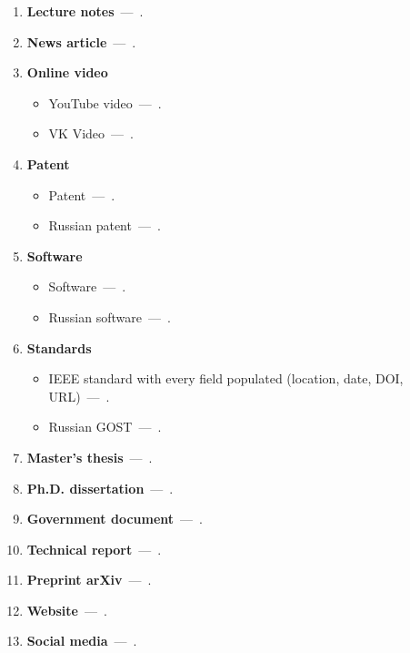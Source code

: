 \documentclass[eqsecnum,authorsinfo]{kioj6}
\begin{document}
\begin{enumerate}
        \item \textbf{Lecture notes}~---~\cite{BarneyLecture}.

        \item \textbf{News article}~---~\cite{MarkoffNews}.

        \item \textbf{Online video}
        \begin{itemize}[nosep]
            \item YouTube video~---~\cite{mtaOnlineVideo}.
            \item VK Video~---~\cite{vkVideoExample}.
        \end{itemize}

        \item \textbf{Patent}
        \begin{itemize}[nosep]
            \item Patent~---~\cite{WilkinsonPatent}.
            \item Russian patent~---~\cite{sviridov}.
        \end{itemize}

        \item \textbf{Software}
        \begin{itemize}[nosep]
            \item Software~---~\cite{ArningSoftware}.
            \item Russian software~---~\cite{schoolPassportSoftware}.
        \end{itemize}

        \item \textbf{Standards}
        \begin{itemize}[nosep]
            \item IEEE standard with every field populated (location, date, DOI, URL)~---~\cite{StdIEEE754Full}.
            \item Russian GOST~---~\cite{gostMed57647}.
        \end{itemize}

        \item \textbf{Master's thesis}~---~\cite{TemirgalievThesis}.

        \item \textbf{Ph.D. dissertation}~---~\cite{MirtichPhD}.

        \item \textbf{Government document}~---~\cite{DEI_Trump}.

        \item \textbf{Technical report}~---~\cite{DE430}.

        \item \textbf{Preprint arXiv}~---~\cite{UrazhdinArxiv}.

        \item \textbf{Website}~---~\cite{ETU}.

        \item \textbf{Social media}~---~\cite{ClarksonX}.
    \end{enumerate}
\end{document}
